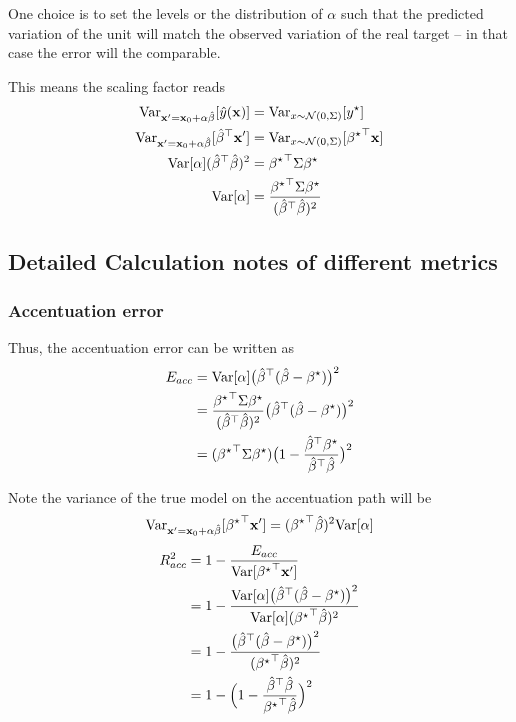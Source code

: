 One choice is to set the levels or the distribution of $\alpha$ such
that the predicted variation of the unit will match the observed variation
of the real target -- in that case the error will the comparable.

This means the scaling factor reads
\begin{align*}
\operatorname{Var}_{\mathbf{x}^{\prime}=\mathbf{x}_{0}+\alpha\hat{\beta}}[\hat{y}(\mathbf{x})] & =\operatorname{Var}_{x\sim\mathcal{N}(0,\Sigma)}[y^{\star}]\\
\operatorname{Var}_{\mathbf{x}^{\prime}=\mathbf{x}_{0}+\alpha\hat{\beta}}[{\hat{\beta}}^{\top}\mathbf{x}^{\prime}] & =\operatorname{Var}_{x\sim\mathcal{N}(0,\Sigma)}[{{\beta^{\star}}}^{\top}\mathbf{x}]\\
\mathrm{Var}[\alpha]({\hat{\beta}}^{\top}\hat{\beta})^{2} & ={{\beta^{\star}}}^{\top}\Sigma{\beta^{\star}}\\
\mathrm{Var}[\alpha] & =\frac{{{\beta^{\star}}}^{\top}\Sigma{\beta^{\star}}}{({\hat{\beta}}^{\top}\hat{\beta})^{2}}
\end{align*}


\subsection{Detailed Calculation notes of different metrics }

\subsubsection{Accentuation error}

Thus, the accentuation error can be written as
\begin{align*}
E_{acc} & =\mathrm{Var}[\alpha]\big({\hat{\beta}}^{\top}(\hat{\beta}-{\beta^{\star}})\big)^{2}\\
 & =\frac{{{\beta^{\star}}}^{\top}\Sigma{\beta^{\star}}}{({\hat{\beta}}^{\top}\hat{\beta})^{2}}\big({\hat{\beta}}^{\top}(\hat{\beta}-{\beta^{\star}})\big)^{2}\\
 & =({{\beta^{\star}}}^{\top}\Sigma{\beta^{\star}})\big(1-\frac{{\hat{\beta}}^{\top}{\beta^{\star}}}{{\hat{\beta}}^{\top}\hat{\beta}}\big)^{2}
\end{align*}

Note the variance of the true model on the accentuation path will
be
\[
\operatorname{Var}_{\mathbf{x}^{\prime}=\mathbf{x}_{0}+\alpha\hat{\beta}}[{{\beta^{\star}}}^{\top}\mathbf{x}^{\prime}]=({{\beta^{\star}}}^{\top}\hat{\beta})^{2}\mathrm{Var}[\alpha]
\]
\begin{align*}
R_{acc}^{2} & =1-\frac{E_{acc}}{\mathrm{Var}[{{\beta^{\star}}}^{\top}\mathbf{x}^{\prime}]}\\
 & =1-\frac{\mathrm{Var}[\alpha]\big({\hat{\beta}}^{\top}(\hat{\beta}-{\beta^{\star}})\big)^{2}}{\mathrm{Var}[\alpha]({{\beta^{\star}}}^{\top}\hat{\beta})^{2}}\\
 & =1-\frac{\big({\hat{\beta}}^{\top}(\hat{\beta}-{\beta^{\star}})\big)^{2}}{({{\beta^{\star}}}^{\top}\hat{\beta})^{2}}\\
 & =1-\Big(1-\frac{{\hat{\beta}}^{\top}\hat{\beta}}{{{\beta^{\star}}}^{\top}\hat{\beta}}\Big)^{2}
\end{align*}

